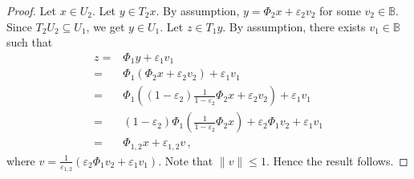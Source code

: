 \documentclass[10pt,a4paper]{amsart}
\begin{document}
\begin{proof}
Let $x\in U_2$.
Let $y\in T_2x$.
By assumption, $y=\Phi_2 x +\varepsilon_2 v_2$ for some $v_2\in\mathbb B$.
Since $T_2U_2\subseteq U_1$, we get $y\in U_1$.
Let $z\in T_1y$.
By assumption, there exists $v_1\in \mathbb B$ such that
\begin{equation}
\begin{array}{rl}
z=&\Phi_1 y+\varepsilon_1 v_1\\
=&\Phi_1 (\Phi_2 x +\varepsilon_2 v_2)+\varepsilon_1 v_1\\
=&\Phi_1 ((1-\varepsilon_2)\frac{1}{1-\varepsilon_2}\Phi_2 x +\varepsilon_2 v_2)+\varepsilon_1 v_1\\
=&(1-\varepsilon_2)\Phi_1 (\frac{1}{1-\varepsilon_2}\Phi_2 x) +\varepsilon_2 \Phi_1v_2+\varepsilon_1 v_1\\
=&\Phi_{1,2} x +\varepsilon_{1,2} v\,,
\end{array}
\end{equation}
where $v=\frac{1}{\varepsilon_{1,2}}(\varepsilon_2 \Phi_1v_2+\varepsilon_1 v_1)$.
Note that $\|v\|\le 1$.
Hence the result follows.
\end{proof}
\end{document}
